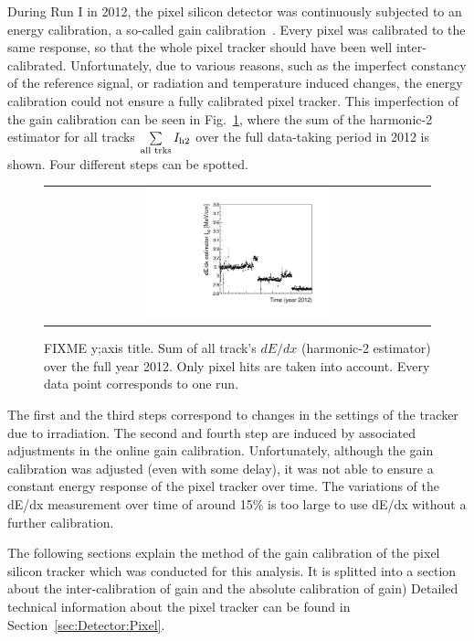 During Run I in 2012, the pixel silicon detector was continuously subjected to an energy calibration, a so-called gain calibration~\cite{bib:Danek}.
Every pixel was calibrated to the same response, so that the whole pixel tracker should have been well inter-calibrated.
Unfortunately, due to various reasons, such as the imperfect constancy of the reference signal, or radiation and temperature induced changes, the energy calibration could not ensure a fully calibrated pixel tracker.
This imperfection of the gain calibration can be seen in Fig.~\ref{fig:StabilityPlot_beforeCalibration}, where the sum of the harmonic-2 estimator for all tracks $\sum\limits_{\text{all trks}}I_{\text{h2}}$ over the full data-taking period in 2012 is shown.
Four different steps can be spotted.
\begin{figure}[!b]
  \centering 
  \begin{tabular}{c}
  \includegraphics[width=0.49\textwidth]{figures/analysis/StabilityPlot_Pixel_beforeCalibration_withoutStepFits_NEW.pdf}
  \end{tabular}
  \caption{FIXME y;axis title. Sum of all track's $dE/dx$ (harmonic-2 estimator) over the full year 2012. Only pixel hits are taken into account. Every data point corresponds to one run.} 
  \label{fig:StabilityPlot_beforeCalibration}
\end{figure}
The first and the third steps correspond to changes in the settings of the tracker due to irradiation.
The second and fourth step are induced by associated adjustments in the online gain calibration.
Unfortunately, although the gain calibration was adjusted (even with some delay), it was not able to ensure a constant energy response of the pixel tracker over time. 
The variations of the dE/dx measurement over time of around 15\% is too large to use dE/dx without a further calibration. 

The following sections explain the method of the gain calibration of the pixel silicon tracker which was conducted for this analysis. 
It is splitted into a section about the inter-calibration of gain and the absolute calibration of gain) 
Detailed technical information about the pixel tracker can be found in Section~\ref{sec:Detector:Pixel}.


